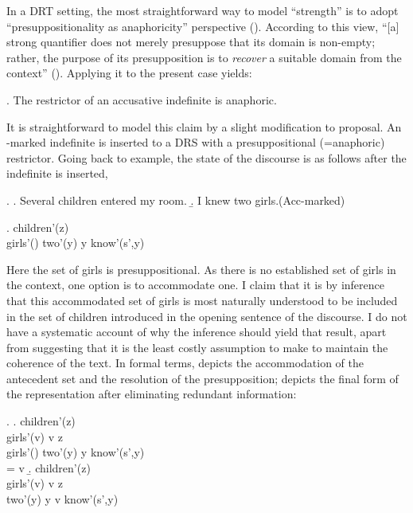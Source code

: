 \documentclass[11pt,a4paper]{article}
\begin{document}
In a DRT setting, the most straightforward way to model ``strength'' is to adopt ``presuppositionality as anaphoricity'' perspective ().  According to this view, ``[a] strong quantifier does not merely presuppose that its domain is non-empty; rather, the purpose of its presupposition is to \emph{recover} a suitable domain from the context'' (). Applying it to the present case yields:

\ex. The restrictor of an accusative indefinite is anaphoric.


It is straightforward to model this claim by a slight modification to  proposal. An \acc-marked indefinite is inserted to a DRS with a presuppositional (=anaphoric) restrictor.  Going back to  example, the state of the discourse is as follows after the indefinite is inserted,

\ex.
\a. Several children entered my room.
\b. I knew two girls.\hfill (Acc-marked)

\ex.
{children'(z)\\
girls'() \quad two'(y) \quad y \subseteq {} \quad know'(s',y)
}

Here the set of girls is presuppositional. As there is no established set of girls in the context, one option is to accommodate one. I claim that it is by inference that this accommodated set of girls is most naturally understood to be included in the set of children introduced in the opening sentence of the discourse. I do not have a systematic account of why the inference should yield that result, apart from suggesting that it is the least costly assumption to make to maintain the coherence of the text.  In formal terms,  depicts the accommodation of the antecedent set and the resolution of the presupposition;  depicts the final form of the representation after eliminating redundant information:

\ex. 
\a.\label{prencaccom}
{children'(z)\\
girls'(v) \quad v \subseteq z\\
girls'() \quad two'(y) \quad y \subseteq {} \quad know'(s',y)\\
 = v
}
\b.\label{prencfin}
{children'(z)\\
girls'(v) \quad v \subseteq z\\
 two'(y) \quad y \subseteq v \quad know'(s',y)
}
\end{document}
